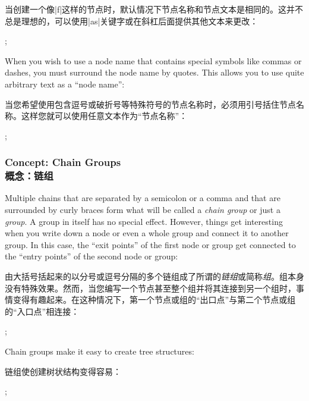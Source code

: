 当创建一个像|f|这样的节点时，默认情况下节点名称和节点文本是相同的。这并不总是理想的，可以使用|as|关键字或在斜杠后面提供其他文本来更改：
%
\begin{codeexample}[preamble={\usetikzlibrary{graphs}}]
\tikz {};
\end{codeexample}

When you wish to use a node name that contains special symbols like commas or
dashes, you must surround the node name by quotes. This allows you to use quite
arbitrary text as a ``node name'':

当您希望使用包含逗号或破折号等特殊符号的节点名称时，必须用引号括住节点名称。这样您就可以使用任意文本作为“节点名称”：
%
\begin{codeexample}[preamble={\usetikzlibrary{graphs}}]
\tikz {};
\end{codeexample}


\subsubsection{Concept: Chain Groups\\概念：链组}

Multiple chains that are separated by a semicolon or a comma and that are
surrounded by curly braces form what will be called a \emph{chain group} or
just a \emph{group}. A group in itself has no special effect. However, things
get interesting when you write down a node or even a whole group and connect it
to another group. In this case, the ``exit points'' of the first node or group
get connected to the ``entry points'' of the second node or group:

由大括号括起来的以分号或逗号分隔的多个链组成了所谓的\emph{链组}或简称\emph{组}。组本身没有特殊效果。然而，当您编写一个节点甚至整个组并将其连接到另一个组时，事情变得有趣起来。在这种情况下，第一个节点或组的“出口点”与第二个节点或组的“入口点”相连接：

%
\begin{codeexample}[preamble={\usetikzlibrary{graphs}}]
\tikz {};
\end{codeexample}

Chain groups make it easy to create tree structures:

链组使创建树状结构变得容易：

%
\begin{codeexample}[width=10cm,preamble={\usetikzlibrary{graphs}}]
\tikz
  ;
\end{codeexample}

